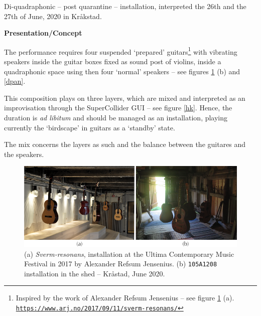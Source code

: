 Di-quadraphonic -- post quarantine -- installation, interpreted the 26th and the 27th of June, 2020 in Kr\aa kstad.

\bigskip

\noindent \textbf{{\large Presentation/Concept}}
\hrulefill

\bigskip

The performance requires four suspended `prepared' guitars\footnote{Inspired by the work of Alexander Refsum Jensenius -- see figure \ref{arj} (a). \\ \href{https://www.arj.no/2017/09/11/sverm-resonans/}{\scriptsize{\texttt{https://www.arj.no/2017/09/11/sverm-resonans/}}}
} with vibrating speakers inside the guitar boxes fixed as sound post of violins, inside a quadraphonic space using then four `normal' speakers -- see figures \ref{arj} (b) and \ref{dpan}.

This composition plays on three layers, which are mixed and interpreted as an improvisation through the SuperCollider GUI -- see figure \ref{hk}. Hence, the duration is \textit{ad libitum} and should be managed as an installation, playing currently the `birdscape' in guitars as a `standby' state. 

The mix concerns the layers as such and the balance between the guitares and the speakers.

 \begin{figure}[hbt]
\begin{center}
	\includegraphics[width=\textwidth]{img/6757}		
\caption{(a) \textit{Sverm-resonans}, installation at the Ultima Contemporary Music Festival in 2017 by Alexander Refsum Jensenius. (b) \texttt{105A1208} installation in the shed -- Kr\aa stad, June 2020.}
\label{arj}
\end{center}
\end{figure}

